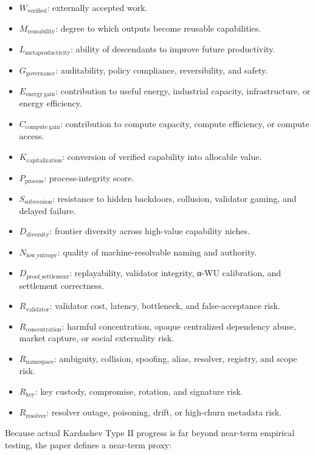 \begin{itemize}
\tightlist
\item
  \(W_{\mathrm{verified}}\): externally accepted work.
\item
  \(M_{\mathrm{reusability}}\): degree to which outputs become reusable
  capabilities.
\item
  \(L_{\mathrm{metaproductivity}}\): ability of descendants to improve
  future productivity.
\item
  \(G_{\mathrm{governance}}\): auditability, policy compliance,
  reversibility, and safety.
\item
  \(E_{\mathrm{energy\ gain}}\): contribution to useful energy,
  industrial capacity, infrastructure, or energy efficiency.
\item
  \(C_{\mathrm{compute\ gain}}\): contribution to compute capacity,
  compute efficiency, or compute access.
\item
  \(K_{\mathrm{capitalization}}\): conversion of verified capability
  into allocable value.
\item
  \(P_{\mathrm{process}}\): process-integrity score.
\item
  \(S_{\mathrm{subversion}}\): resistance to hidden backdoors,
  collusion, validator gaming, and delayed failure.
\item
  \(D_{\mathrm{diversity}}\): frontier diversity across high-value
  capability niches.
\item
  \(N_{\mathrm{low\_entropy}}\): quality of machine-resolvable naming
  and authority.
\item
  \(D_{\mathrm{proof\_settlement}}\): replayability, validator
  integrity, α-WU calibration, and settlement correctness.
\item
  \(R_{\mathrm{validator}}\): validator cost, latency, bottleneck, and
  false-acceptance risk.
\item
  \(R_{\mathrm{concentration}}\): harmful concentration, opaque
  centralized dependency abuse, market capture, or social externality
  risk.
\item
  \(R_{\mathrm{namespace}}\): ambiguity, collision, spoofing, alias,
  resolver, registry, and scope risk.
\item
  \(R_{\mathrm{key}}\): key custody, compromise, rotation, and signature
  risk.
\item
  \(R_{\mathrm{resolver}}\): resolver outage, poisoning, drift, or
  high-churn metadata risk.
\end{itemize}

Because actual Kardashev Type II progress is far beyond near-term
empirical testing, the paper defines a near-term proxy:

